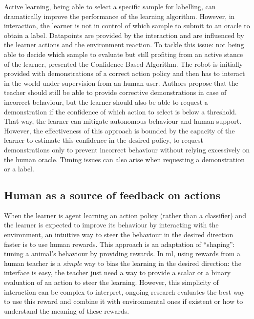 Active learning, being able to select a specific sample for labelling, can dramatically improve the performance of the learning algorithm. However, in interaction, the learner is not in control of which sample to submit to an oracle to obtain a label. Datapoints are provided by the interaction and are influenced by the learner actions and the environment reaction. To tackle this issue: not being able to decide which sample to evaluate but still profiting from an active stance of the learner,  \cite{chernova2009} presented the Confidence Based Algorithm. The robot is initially provided with demonstrations of a correct action policy and then has to interact in the world under supervision from an human user. Authors propose that the teacher should still be able to provide corrective demonstrations in case of incorrect behaviour, but the learner should also be able to request a demonstration if the confidence of which action to select is below a threshold. That way, the learner can mitigate autonomous behaviour and human support. However, the effectiveness of this approach is bounded by the capacity of the learner to estimate this confidence in the desired policy, to request demonstrations only to prevent incorrect behaviour without relying excessively on the human oracle. Timing issues can also arise when requesting a demonstration or a label.

\subsection{Human as a source of feedback on actions}

When the learner is agent learning an action policy (rather than a classifier) and the learner is expected to improve its behaviour by interacting with the environment, an intuitive way to steer the behaviour in the desired direction faster is to use human rewards. This approach is an adaptation of ``shaping'': tuning a animal's behaviour by providing rewards. In \gls{ml}, using rewards from a human teacher is a \textit{simple} way to bias the learning in the desired direction: the interface is easy, the teacher just need a way to provide a scalar or a binary evaluation of an action to steer the learning. However, this simplicity of interaction can be complex to interpret, ongoing research evaluates the best way to use this reward and combine it with environmental ones if existent \citep{knox2010combining} or how to understand the meaning of these rewards. 

